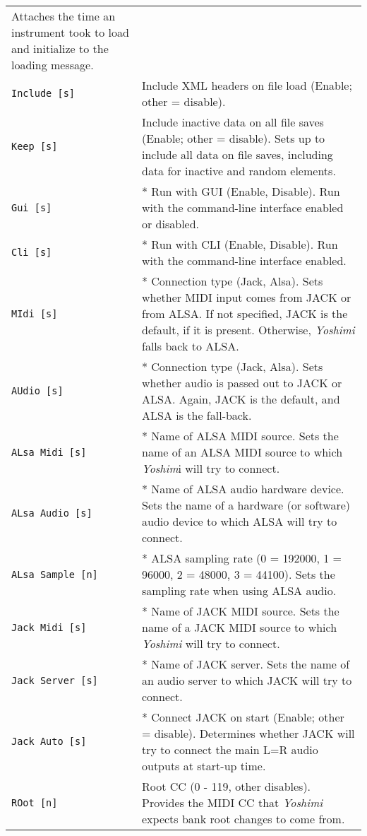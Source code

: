 \begin{center}
\begin{longtable}{p{4cm} p{10cm}}
   Attaches the time an instrument took to load and initialize to the loading
   message. \\
\texttt{Include [s]} &
   Include XML headers on file load (Enable; other = disable). \\
\texttt{Keep [s]} &
   Include inactive data on all file saves (Enable; other = disable).
   Sets up to include all data on file saves, including data for
   inactive and random elements. \\
\texttt{Gui [s]} &
   * Run with GUI (Enable, Disable).
   Run with the command-line interface enabled or disabled.  \\
\texttt{Cli [s]} &
   * Run with CLI (Enable, Disable).
   Run with the command-line interface enabled. \\
\texttt{MIdi [s]} &
   * Connection type (Jack, Alsa).
   Sets whether MIDI input comes from JACK or from ALSA.
   If not specified, JACK is the default, if it is present.  Otherwise,
   \textsl{Yoshimi} falls back to ALSA. \\
\texttt{AUdio [s]} &
   * Connection type (Jack, Alsa).
   Sets whether audio is passed out to JACK or ALSA.  Again, JACK is the
   default, and ALSA is the fall-back.  \\
\texttt{ALsa Midi [s]} &
   * Name of ALSA MIDI source.
   Sets the name of an ALSA MIDI source to which
   \textsl{Yoshim}i will try to connect.  \\
\texttt{ALsa Audio [s]} &
   * Name of ALSA audio hardware device.
   Sets the name of a hardware (or software)
   audio device to which ALSA will try to connect.  \\
\texttt{ALsa Sample [n]} &
   * ALSA sampling rate (0 = 192000, 1 = 96000, 2 = 48000, 3 = 44100).
   Sets the sampling rate when using ALSA audio. \\
\texttt{Jack Midi [s]} &
   * Name of JACK MIDI source.
   Sets the name of a JACK MIDI source to which
   \textsl{Yoshimi} will try to connect.  \\
\texttt{Jack Server [s]} &
   * Name of JACK server.
   Sets the name of an audio server to which JACK will try to connect. \\
\texttt{Jack Auto [s]} &
   * Connect JACK on start (Enable; other = disable).
   Determines whether JACK will try to connect the main L=R audio outputs at
   start-up time. \\
\texttt{ROot [n]} &
   Root CC (0 - 119, other disables).
   Provides the MIDI CC that \textsl{Yoshimi} expects bank root changes to come
   from.  \\

\end{longtable}
\end{center}
